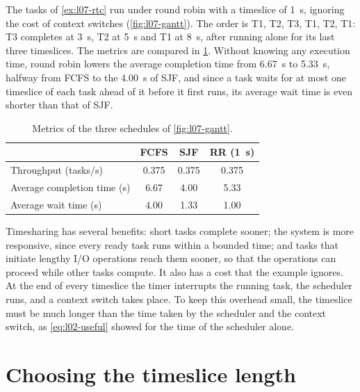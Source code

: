 \documentclass[../main.tex]{subfiles}
\begin{document}
\begin{example}
  The tasks of \cref{ex:l07-rtc} run under round robin with a timeslice of
  \SI{1}{\second}, ignoring the cost of context switches
  (\cref{fig:l07-gantt}).  The order is T1, T2, T3, T1, T2, T1: T3
  completes at \SI{3}{\second}, T2 at \SI{5}{\second} and T1 at
  \SI{8}{\second}, after running alone for its last three timeslices.  The
  metrics are compared in \cref{tab:l07-rr}.  Without knowing any execution
  time, round robin lowers the average completion time from
  \SI{6.67}{\second} to \SI{5.33}{\second}, halfway from FCFS to the
  \SI{4.00}{\second} of SJF, and since a task waits for at most one
  timeslice of each task ahead of it before it first runs, its average wait
  time is even shorter than that of SJF.
\end{example}

\begin{table}[htbp]
  \centering
  \caption{Metrics of the three schedules of \cref{fig:l07-gantt}.}
  \label{tab:l07-rr}
  \small
  \begin{tabular}{@{}lccc@{}}
    \toprule
    & FCFS & SJF & RR (\SI{1}{\second}) \\
    \midrule
    Throughput (tasks/s)    & 0.375 & 0.375 & 0.375 \\
    Average completion time (s) & 6.67 & 4.00 & 5.33 \\
    Average wait time (s)       & 4.00 & 1.33 & 1.00 \\
    \bottomrule
  \end{tabular}
\end{table}

Timesharing has several benefits: short tasks complete sooner; the system
is more responsive, since every ready task runs within a bounded time; and
tasks that initiate lengthy I/O operations reach them sooner, so that the
operations can proceed while other tasks compute.  It also has a cost that
the example ignores.  At the end of every timeslice the timer interrupts
the running task, the scheduler runs, and a context switch takes place.  To
keep this overhead small, the timeslice must be much longer than the time
taken by the scheduler and the context switch, as \cref{eq:l02-useful}
showed for the time of the scheduler alone.

\section{Choosing the timeslice length}
\label{sec:l07-timeslice}
\end{document}
